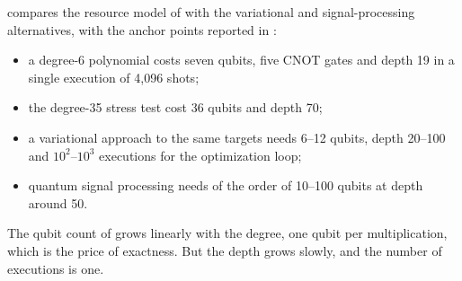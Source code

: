 compares the resource model of \nnqa{} with the variational and signal-processing alternatives, with the anchor points reported in \cite{guo2026nnqa}:
\begin{itemize}
\item a degree-6 polynomial costs \nnqa{} seven qubits, five CNOT gates and depth 19 in a single execution of 4,096 shots;
\item the degree-35 stress test cost \nnqa{} 36 qubits and depth 70;
\item a variational approach to the same targets needs 6--12 qubits, depth 20--100 and $10^2$--$10^3$ executions for the optimization loop;
\item quantum signal processing needs of the order of 10--100 qubits at depth around 50.
\end{itemize}
The qubit count of \nnqa{} grows linearly with the degree, one qubit per multiplication, which is the price of exactness. But the depth grows slowly, and the number of executions is one.

